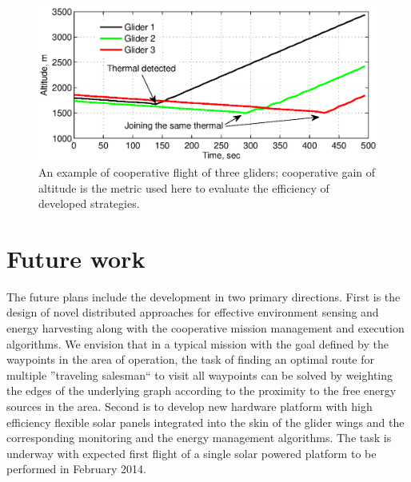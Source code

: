 \documentclass{ifacconf}
\newcommand{\squeezeup}{\vspace{-2.0mm}}
\begin{document}
\begin{figure}[thpb]
  \centering
  \includegraphics[scale=0.45]{Figures/Coop_gain_altitude.eps}
  \caption{An example of cooperative flight of three gliders; cooperative gain of altitude is the
  metric used here to evaluate the efficiency of developed strategies.}
  \label{fig:CoopFlightHeight}
\end{figure}

\section{Future work}
\label{sec:Future}
\squeezeup

The future plans include the development in two primary directions. First is
the design of novel distributed approaches for effective environment sensing
and energy harvesting along with the cooperative mission management and
execution algorithms. We envision that in a typical mission with the goal
defined by the waypoints in the area of operation, the task of finding an
optimal route for multiple ''traveling salesman`` to visit all waypoints can
be solved by weighting the edges of the underlying graph according to the
proximity to the free energy sources in the area. Second is to develop new
hardware platform with high efficiency flexible solar panels integrated into
the skin of the glider wings and the corresponding monitoring and the energy
management algorithms. The task is underway with expected first flight of a
single solar powered platform to be performed in February 2014.

%
\end{document}

